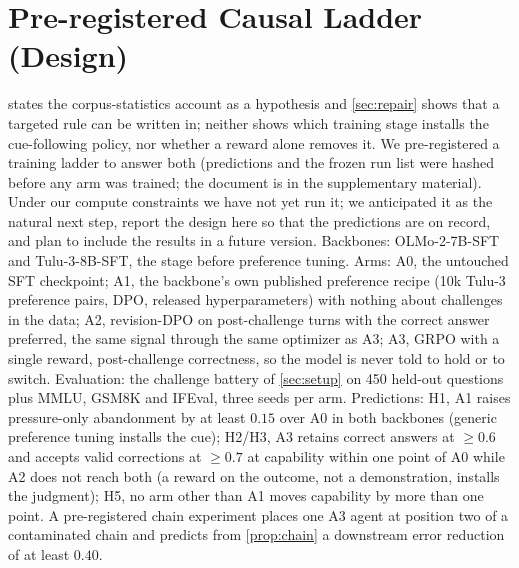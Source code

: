 \documentclass{article}
\begin{document}
\section{Pre-registered Causal Ladder (Design)}
\label{app:ladder}
 states the corpus-statistics account as a hypothesis and \cref{sec:repair} shows that a targeted rule can be written in; neither shows which training stage installs the cue-following policy, nor whether a reward alone removes it. We pre-registered a training ladder to answer both (predictions and the frozen run list were hashed before any arm was trained; the document is in the supplementary material). Under our compute constraints we have not yet run it; we anticipated it as the natural next step, report the design here so that the predictions are on record, and plan to include the results in a future version. Backbones: OLMo-2-7B-SFT and Tulu-3-8B-SFT, the stage before preference tuning. Arms: A0, the untouched SFT checkpoint; A1, the backbone's own published preference recipe (10k Tulu-3 preference pairs, DPO, released hyperparameters) with nothing about challenges in the data; A2, revision-DPO on post-challenge turns with the correct answer preferred, the same signal through the same optimizer as A3; A3, GRPO with a single reward, post-challenge correctness, so the model is never told to hold or to switch. Evaluation: the challenge battery of \cref{sec:setup} on 450 held-out questions plus MMLU, GSM8K and IFEval, three seeds per arm. Predictions: H1, A1 raises pressure-only abandonment by at least $0.15$ over A0 in both backbones (generic preference tuning installs the cue); H2/H3, A3 retains correct answers at $\geq 0.6$ and accepts valid corrections at $\geq 0.7$ at capability within one point of A0 while A2 does not reach both (a reward on the outcome, not a demonstration, installs the judgment); H5, no arm other than A1 moves capability by more than one point. A pre-registered chain experiment places one A3 agent at position two of a contaminated chain and predicts from \cref{prop:chain} a downstream error reduction of at least $0.40$.
\end{document}
